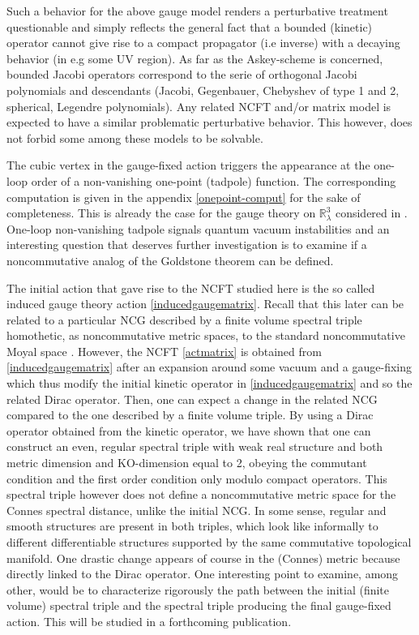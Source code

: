 \documentclass[a4paper]{jpconf}
\numberwithin{equation}{section}
\theoremstyle{nonumberplain}
\begin{document}
Such a behavior for the above gauge model renders a perturbative treatment questionable and simply reflects the general fact that a bounded (kinetic) operator cannot give rise to a compact propagator (i.e inverse) with a decaying behavior (in e.g some UV region). As far as the Askey-scheme is concerned, bounded Jacobi operators correspond to the serie of orthogonal Jacobi polynomials and descendants (Jacobi, Gegenbauer, Chebyshev of type 1 and 2, spherical, Legendre polynomials). Any related NCFT and/or matrix model is expected to have a similar problematic perturbative behavior. This however, does not forbid some among these models to be solvable.\par

The cubic vertex in the gauge-fixed action triggers the appearance at the one-loop order of a non-vanishing one-point (tadpole) function. The corresponding computation is given in the appendix \ref{onepoint-comput} for the sake of completeness. This is already the case for the gauge theory on $\mathbb{R}^3_\lambda$ considered in \cite{gvw13}. One-loop non-vanishing tadpole signals quantum vacuum instabilities and an interesting question that deserves further investigation is to examine if a noncommutative analog of the Goldstone theorem can be defined.\par

The initial action that gave rise to the NCFT studied here is the so called induced gauge theory action \eqref{inducedgaugematrix}. Recall that this later can be related to a particular NCG described by a finite volume spectral triple \cite{finite-vol} homothetic, as noncommutative metric spaces, to the standard noncommutative Moyal space \cite{homot-moyal}. However, the NCFT \eqref{actmatrix} is obtained from \eqref{inducedgaugematrix} after an expansion around some vacuum and a gauge-fixing which thus modify the initial kinetic operator in \eqref{inducedgaugematrix} and so the related Dirac operator. Then, one can expect a change in the related NCG compared to the one described by a finite volume triple. By using a Dirac operator obtained from the kinetic operator, we have shown that one can construct an even, regular spectral triple with weak real structure and both metric dimension and KO-dimension equal to 2, obeying the commutant condition and the first order condition only modulo compact operators. 
This spectral triple however does not define a noncommutative metric space for the Connes spectral distance, unlike the initial NCG. In some sense, regular and smooth structures are present in both triples, which look like informally to different differentiable structures supported by the same commutative topological manifold. One drastic change appears of course in the (Connes) metric because directly linked to the Dirac operator. One interesting point to examine, among other, would be to characterize rigorously the path between the initial (finite volume) spectral triple and the spectral triple producing the final gauge-fixed action. This will be studied in a forthcoming publication.\par
\end{document}
